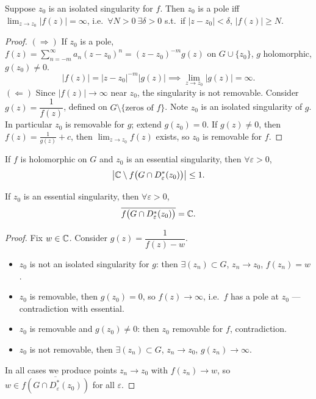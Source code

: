 \documentclass[11pt]{article}
\begin{document}
\begin{theorem}
Suppose $z_0$ is an isolated singularity for $f$. Then $z_0$ is a pole iff $\lim_{z\to z_0}|f(z)|=\infty$, i.e.\ $\forall N>0\ \exists\delta>0$ s.t.\ if $|z-z_0|<\delta$, $|f(z)|\ge N$.
\end{theorem}
\begin{proof}
$(\Rightarrow)$ If $z_0$ is a pole, $f(z)=\sum_{n=-m}^\infty a_n(z-z_0)^n = (z-z_0)^{-m}g(z)$ on $G\cup\{z_0\}$, $g$ holomorphic, $g(z_0)\ne0$.
\[
|f(z)| = |z-z_0|^{-m}|g(z)| \implies \lim_{z\to z_0} |g(z)| = \infty.
\]
$(\Leftarrow)$ Since $|f(z)|\to\infty$ near $z_0$, the singularity is not removable. Consider $g(z)=\dfrac{1}{f(z)}$, defined on $G\setminus\{\text{zeros of }f\}$. Note $z_0$ is an isolated singularity of $g$. In particular $z_0$ is removable for $g$; extend $g(z_0)=0$. If $g(z)\ne0$, then $f(z)=\frac{1}{g(z)}+c$, then $\lim_{z\to z_0}f(z)$ exists, so $z_0$ is removable for $f$.
\end{proof}

\begin{theorem}
If $f$ is holomorphic on $G$ and $z_0$ is an essential singularity, then $\forall \varepsilon>0$,
\[
\left|{\mathbb{C}}\setminus f\big(G\cap D_\varepsilon^*(z_0)\big)\right| \le 1.
\]
\end{theorem}

\begin{theorem}
If $z_0$ is an essential singularity, then $\forall\varepsilon>0$,
\[
\overline{f\big(G\cap D_\varepsilon^*(z_0)\big)} = {\mathbb{C}}.
\]
\end{theorem}
\begin{proof}
Fix $w\in{\mathbb{C}}$. Consider $g(z) = \dfrac{1}{f(z)-w}$.
\begin{itemize}
\item[\emph{Case 1:}] $z_0$ is not an isolated singularity for $g$: then $\exists (z_n)\subset G$, $z_n\to z_0$, $f(z_n)=w$.
\item[\emph{Case 2:}] $z_0$ is removable, then $g(z_0)=0$, so $f(z)\to\infty$, i.e.\ $f$ has a pole at $z_0$ --- contradiction with essential.
\item[\emph{Case 3:}] $z_0$ is removable and $g(z_0)\ne0$: then $z_0$ removable for $f$, contradiction.
\item[\emph{Case 4:}] $z_0$ is not removable, then $\exists (z_n)\subset G$, $z_n\to z_0$, $g(z_n)\to\infty$.
\end{itemize}
In all cases we produce points $z_n\to z_0$ with $f(z_n)\to w$, so $w \in \overline{f(G\cap D_\varepsilon^*(z_0))}$ for all $\varepsilon$.
\end{proof}
\end{document}
